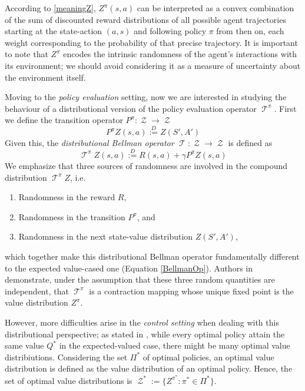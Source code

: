 \documentclass[12pt,a4paper,openright,twoside]{article}
\DeclareMathOperator*{\T}{\mathcal{T}}
\DeclareMathOperator*{\Z}{\mathcal{Z}}
\numberwithin{equation}{section}
\theoremstyle{definition}
\theoremstyle{remark}
\theoremstyle{plain}
\begin{document}
According to \ref{meaningZ}, $Z^{\pi}(s,a)$ can be interpreted as a convex combination of the sum of discounted reward distributions of all possible agent trajectories starting at the state-action $(a,s)$ and following policy $\pi$ from then on, each weight corresponding to the probability of that precise trajectory. It is important to note that $Z^\pi$ encodes the intrinsic randomness of the agent's interactions with its environment; we should avoid considering it as a measure of uncertainty about the environment itself.

Moving to the \textit{policy evaluation} setting, now we are interested in studying the behaviour of a distributional version of the policy evaluation operator $\T^\pi$. First we define the transition operator $P^\pi : \Z \rightarrow \Z$ 
\begin{equation} \label{distTransitionOp}
	P^\pi Z(s,a) \stackrel{D}{:=} Z(S',A')
\end{equation}
Given this, the \textit{distributional Bellman operator} $\T : \Z \rightarrow \Z$ is defined as
\begin{equation} \label{distBellmanOp}
	{\T}^\pi Z(s,a) \stackrel{D}{:=} R(s,a) + \gamma P^{\pi} Z(s,a)
\end{equation}
We emphasize that three sources of randomness are involved in the compound distribution ${\T}^\pi Z$, i.e.
\begin{enumerate}
	\item Randomness in the reward $R$,
	\item Randomness in the transition $P^\pi$, and
	\item Randomness in the next state-value distribution $Z(S', A')$,
\end{enumerate} 
which together make this distributional Bellman operator fundamentally different to the expected value-cased one (Equation \ref{BellmanOp}). Authors in \cite{DRL} demonstrate, under the assumption that these three random quantities are independent, that ${\T}^\pi$ is a contraction mapping whose unique fixed point is the value distribution $Z^\pi$.


However, more difficulties arise in the \textit{control setting} when dealing with this distributional perspective; as stated in \cite{DRL}, while every optimal policy attain the same value $Q^*$ in the expected-valued case, there might be many optimal value distribiutions. Considering the set $\Pi^*$ of optimal policies, an optimal value distribution is defined as the value distribution of an optimal policy. Hence, the set of optimal value distributions is $\Z^* := \{ Z^{\pi^*} : \pi^* \in \Pi^* \}$.
\end{document}
